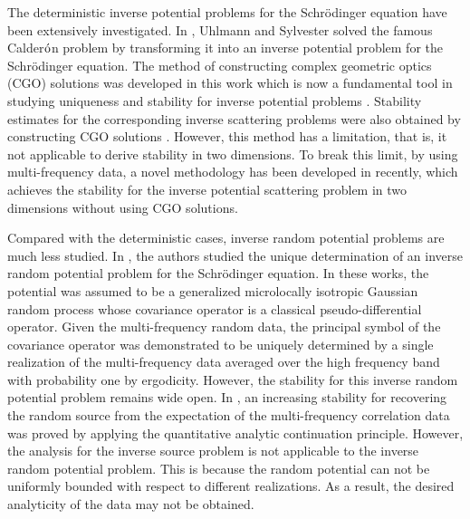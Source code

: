 \documentclass[reqno, 12pt]{amsart}
\numberwithin{equation}{section}
\begin{document}
The deterministic inverse potential problems for the Schr\"odinger equation have been extensively investigated. In \cite{Uhlmann}, Uhlmann and Sylvester solved the famous Calder$\acute{\rm o}$n problem by transforming it into an inverse potential problem for the  Schr\"odinger equation. The method of constructing complex geometric optics (CGO) solutions was developed in this work which is now a fundamental tool in studying uniqueness and stability for inverse potential problems \cite{Ale, Isakov1, U_1}. Stability estimates for the corresponding inverse scattering problems were also obtained by constructing CGO solutions \cite{HH, IN}. However, this method has a limitation, that is, it not applicable to derive stability in two dimensions. To break this limit, by using multi-frequency data, a novel methodology has been  developed in \cite{ZZ} recently, which achieves the stability for the inverse potential scattering problem in two dimensions without using CGO solutions.

Compared with the deterministic cases, inverse random potential problems are much less studied. In \cite{Caro, LPS}, the authors studied the unique determination of an inverse random potential problem for 
the Schr\"odinger equation. In these works, the potential was assumed to be a generalized microlocally isotropic Gaussian random process whose covariance operator is a classical 
pseudo-differential operator. Given the multi-frequency random data, the principal symbol of the covariance operator was demonstrated to be uniquely determined by a single realization of the multi-frequency data averaged over the high frequency band with probability one by ergodicity. However, the stability for this inverse random potential problem remains wide open. In \cite{wang2024stability}, an increasing stability for recovering the random source from the expectation of the multi-frequency correlation data was proved by applying the quantitative analytic continuation principle. However, the analysis for the inverse source problem is not applicable to the 
inverse random potential problem. This is because the random potential can not be uniformly bounded with respect to different realizations. As a result,
the desired analyticity of the data may not be obtained.
\end{document}
